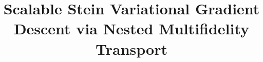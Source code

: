

\usepackage{lipsum}
\usepackage{amsfonts}
\usepackage{graphicx}
\usepackage{epstopdf}
\usepackage{algorithmic}
\ifpdf
\else
\fi

\usepackage{enumitem}

\newcommand{\creflastconjunction}{, and~}




\title{Scalable Stein Variational Gradient Descent via Nested Multifidelity Transport}


\usepackage{amsopn}
\DeclareMathOperator{\diag}{diag}


\makeatletter
\newcommand*{\addFileDependency}[1]{%
  \typeout{(#1)}%
  \@addtofilelist{#1}%
  \IfFileExists{#1}{}{\typeout{No file #1.}}%
}
\makeatother

\newcommand*{\myexternaldocument}[1]{%
    \addFileDependency{#1.tex}%
    \addFileDependency{#1.aux}%
}

